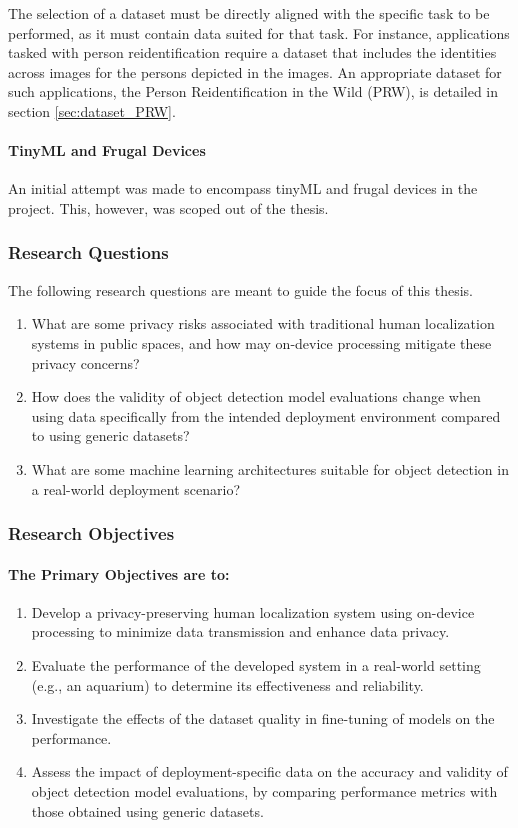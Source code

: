 The selection of a dataset must be directly aligned with the specific task to be performed, as it must contain data suited for that task. For instance, applications tasked with person reidentification require a dataset that includes the identities across images for the persons depicted in the images. An appropriate dataset for such applications, the Person Reidentification in the Wild (PRW), is detailed in section \ref{sec:dataset_PRW}.

\paragraph{TinyML and Frugal Devices}
\label{sec:scope_tinyML}
An initial attempt was made to encompass tinyML and frugal devices in the project. This, however, was scoped out of the thesis. 

\subsubsection{Research Questions}
\label{sec:research_questions}
The following research questions are meant to guide the focus of this thesis.
\begin{enumerate}
	\item What are some privacy risks associated with traditional human localization systems in public spaces, and how may on-device processing mitigate these privacy concerns?
	\item How does the validity of object detection model evaluations change when using data specifically from the intended deployment environment compared to using generic datasets?
	\item What are some machine learning architectures suitable for object detection in a real-world deployment scenario?
\end{enumerate}

\subsubsection{Research Objectives}
\label{sec:research_objectives}
\paragraph{The Primary Objectives are to:}
\begin{enumerate}
	\item Develop a privacy-preserving human localization system using on-device processing to minimize data transmission and enhance data privacy.
	\item Evaluate the performance of the developed system in a real-world setting (e.g., an aquarium) to determine its effectiveness and reliability.
	\item Investigate the effects of the dataset quality in fine-tuning of models on the performance.
	\item Assess the impact of deployment-specific data on the accuracy and validity of object detection model evaluations, by comparing performance metrics with those obtained using generic datasets.
\end{enumerate}

